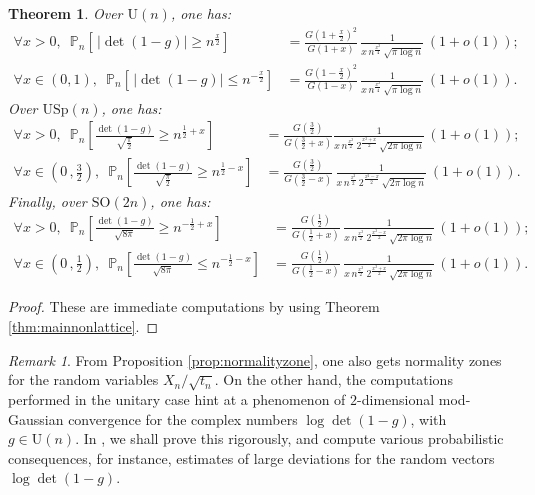 \documentclass[12pt,a4paper,reqno]{amsart}
\newtheorem{theorem}[lemma]{Theorem}
\theoremstyle{remark}
\newtheorem{remark}[lemma]{Remark}
\newcommand{\proba}{\mathbb{P}}
\begin{document}
\begin{theorem}\label{thm:characteristicpolynomial}
Over $\mathrm{U}(n)$, one has:
\begin{align*}
\forall x>0,\,\,\,\proba_{n}\!\left[\,|\det(1-g)| \geq n^{\frac{x}{2}}\right]
&= \frac{G(1+\frac{x}{2})^{2}}{G(1+x)}\,\frac{1}{x\,n^{\frac{x^2}{4}}\, \sqrt{\pi \log n}}\, (1+o(1)); \\
\forall x \in (0,1),\,\,\,\proba_{n}\!\left[\,|\det(1-g)| \leq n^{-\frac{x}{2}}\right]
&= \frac{G(1-\frac{x}{2})^{2}}{G(1-x)}\,\frac{1}{x\,n^{\frac{x^2}{4}}\, \sqrt{\pi \log n}}\, (1+o(1)).
\end{align*}
Over $\mathrm{USp}(n)$, one has:
\begin{align*}
\forall x>0,\,\,\,\proba_{n}\!\left[\frac{\det(1-g)}{\sqrt{\frac{\pi}{2}}} \geq n^{\frac{1}{2}+x}\right] & = \frac{G(\frac{3}{2})}{G(\frac{3}{2}+x)}\frac{1}{x\,n^{\frac{x^{2}}{2}}\,2^{\frac{x^2+x}{2}}\,\sqrt{2\pi \log n}}\, (1+o(1));\\
\forall x\in \left(\!0\,,\frac{3}{2}\right)\!,\,\,\,\proba_{n}\!\left[\frac{\det(1-g)}{\sqrt{\frac{\pi}{2}}} \geq n^{\frac{1}{2}-x}\right] & = \frac{G(\frac{3}{2})}{G(\frac{3}{2}-x)}\,\frac{1}{x\,n^{\frac{x^{2}}{2}}\,2^{\frac{x^2-x}{2}}\,\sqrt{2\pi \log n}}\, (1+o(1)).
\end{align*}
Finally, over $\mathrm{SO}(2n)$, one has: 
\begin{align*}\forall x>0,\,\,\,\proba_{n}\!\left[\frac{\det(1-g)}{\sqrt{8\pi}} \geq n^{-\frac{1}{2}+x}\right] &= \frac{G(\frac{1}{2})}{G(\frac{1}{2}+x)}\,\frac{1}{x\,n^{\frac{x^{2}}{2}}\,2^{\frac{x^2-x}{2}}\,\sqrt{2\pi \log n}}\, (1+o(1));\\
\forall x\in \left(\!0\,,\frac{1}{2}\right)\!,\,\,\,\proba_{n}\!\left[\frac{\det(1-g)}{\sqrt{8\pi}} \leq n^{-\frac{1}{2}-x}\right] &= \frac{G(\frac{1}{2})}{G(\frac{1}{2}-x)}\,\frac{1}{x\,n^{\frac{x^{2}}{2}}\,2^{\frac{x^2+x}{2}}\,\sqrt{2\pi \log n}}\, (1+o(1)).
\end{align*}
\end{theorem}
\medskip

\begin{proof}
These are immediate computations by using Theorem \ref{thm:mainnonlattice}.
\end{proof}\bigskip

\begin{remark}
From Proposition \ref{prop:normalityzone}, one also gets normality zones for the random variables $X_n/\sqrt{t_n}$. On the other hand, the computations performed in the unitary case hint at a phenomenon of $2$-dimensional mod-Gaussian convergence for the complex numbers $\log \det(1-g)$, with $g \in \mathrm{U}(n)$. In \cite{Multidim}, we shall prove this rigorously, and compute various probabilistic consequences, for instance, estimates of large deviations for the random vectors $\log \det (1-g)$.
\end{remark}
\end{document}
